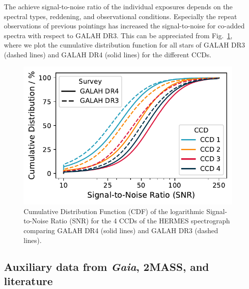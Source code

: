 \documentclass[
  journal=pasa,
  manuscript=research-paper, %
  year=2024,
  volume=37
]{cup-journal}
\newcommand{\Gaia}{\textit{Gaia}\xspace}
\begin{document}
The achieve signal-to-noise ratio of the individual exposures depends on the spectral types, reddening, and observational conditions. Especially the repeat observations of previous pointings has increased the signal-to-noise for co-added spectra with respect to GALAH DR3. This can be appreciated from Fig.~\ref{fig:snr_distribution}, where we plot the cumulative distribution function for all stars of GALAH DR3 (dashed lines) and GALAH DR4 (solid lines) for the different CCDs. 

\begin{figure}
    \centering
    \includegraphics[width=\columnwidth]{figures/snr_distribution.pdf}
    \caption{Cumulative Distribution Function (CDF) of the logarithmic Signal-to-Noise Ratio (SNR) for the 4 CCDs of the HERMES spectrograph comparing GALAH DR4 (solid lines) and GALAH DR3 (dashed lines).}
    \label{fig:snr_distribution}
\end{figure}

\subsection{Auxiliary data from \Gaia, 2MASS, and literature} \label{sec:non-spec_data}

\end{document}
